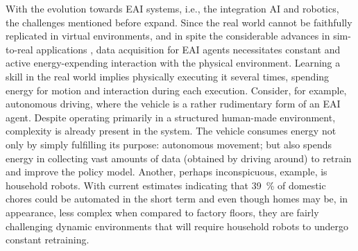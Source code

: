 \documentclass[12pt]{article}
\begin{document}
With the evolution towards EAI systems, i.e., the integration AI and robotics, the challenges mentioned before expand. Since the real world cannot be faithfully replicated in virtual environments, and in spite the considerable advances in sim-to-real applications \cite{Chebotar2019Closingsimreal}, data acquisition for EAI agents necessitates constant and active energy-expending interaction with the physical environment. Learning a skill in the real world implies physically executing it several times, spending energy for motion and interaction during each execution. Consider, for example, autonomous driving, where the vehicle is a rather rudimentary form of an EAI agent. Despite operating primarily in a structured human-made environment, complexity is already present in the system. The vehicle consumes energy not only by simply fulfilling its purpose: autonomous movement; but also spends energy in collecting vast amounts of data (obtained by driving around) to retrain and improve the policy model. Another, perhaps inconspicuous, example, is household robots. With current estimates indicating that 39~\%  of domestic chores could be automated in the short term \cite{Lehdonvirta2022futuresunpaidwork} and even though homes may be, in appearance, less complex when compared to factory floors, they are fairly challenging dynamic environments that will require household robots to undergo constant retraining. 
\end{document}
